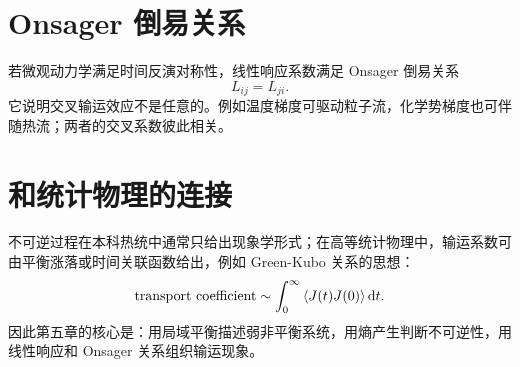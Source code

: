 \section{Onsager 倒易关系}

若微观动力学满足时间反演对称性，线性响应系数满足 Onsager 倒易关系
\[
  L_{ij}=L_{ji}.
\]
它说明交叉输运效应不是任意的。例如温度梯度可驱动粒子流，化学势梯度也可伴随热流；两者的交叉系数彼此相关。

\section{和统计物理的连接}

不可逆过程在本科热统中通常只给出现象学形式；在高等统计物理中，输运系数可由平衡涨落或时间关联函数给出，例如 Green-Kubo 关系的思想：
\[
  \text{transport coefficient}
  \sim \int_0^\infty \left\langle J(t)J(0) \right\rangle\mathrm{d} t .
\]
因此第五章的核心是：用局域平衡描述弱非平衡系统，用熵产生判断不可逆性，用线性响应和 Onsager 关系组织输运现象。
